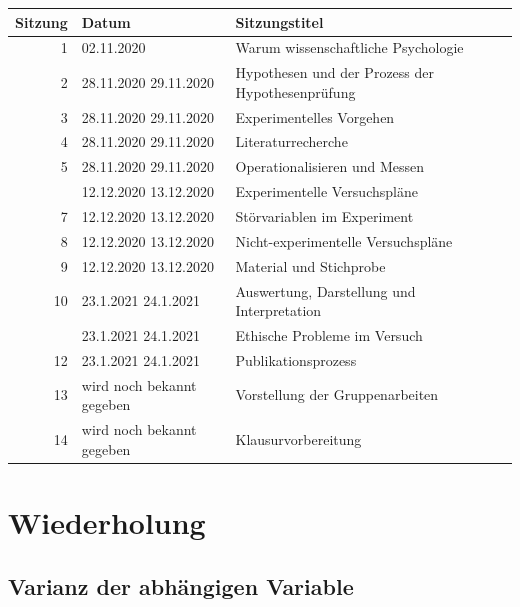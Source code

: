 \documentclass[
]{book}
\begin{document}
\begin{tabular}[t]{rll}
\toprule
Sitzung & Datum & Sitzungstitel\\
\midrule
1 & 02.11.2020 & Warum wissenschaftliche Psychologie\\
2 & 28.11.2020
29.11.2020 & Hypothesen und der Prozess der Hypothesenprüfung\\
3 & 28.11.2020
29.11.2020 & Experimentelles Vorgehen\\
4 & 28.11.2020
29.11.2020 & Literaturrecherche\\
5 & 28.11.2020
29.11.2020 & Operationalisieren und Messen\\
\addlinespace
6 & 12.12.2020
13.12.2020 & Experimentelle Versuchspläne\\
7 & 12.12.2020
13.12.2020 & Störvariablen im Experiment\\
8 & 12.12.2020
13.12.2020 & Nicht-experimentelle Versuchspläne\\
9 & 12.12.2020
13.12.2020 & Material und Stichprobe\\
10 & 23.1.2021
24.1.2021 & Auswertung, Darstellung und Interpretation\\
\addlinespace
11 & 23.1.2021
24.1.2021 & Ethische Probleme im Versuch\\
12 & 23.1.2021
24.1.2021 & Publikationsprozess\\
13 & wird noch bekannt gegeben & Vorstellung der Gruppenarbeiten\\
14 & wird noch bekannt gegeben & Klausurvorbereitung\\
\bottomrule
\end{tabular}

\hypertarget{wiederholung-6}{%
\section{Wiederholung}\label{wiederholung-6}}

\hypertarget{varianz-der-abhuxe4ngigen-variable-1}{%
\subsection{Varianz der abhängigen Variable}\label{varianz-der-abhuxe4ngigen-variable-1}}
\end{document}
